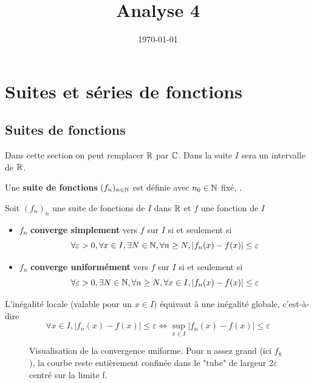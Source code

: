 \documentclass[a4paper,12pt]{article}
\title{ Analyse 4 }
\date{\today}
\begin{document}
\maketitle
\tableofcontents
\clearpage

\section{Suites et séries de fonctions}

\subsection{Suites de fonctions}

Dans cette section on peut remplacer $\mathbb{R}$ par $\mathbb{C}$.
Dans la suite $I$ sera un intervalle de $\mathbb{R}$.

\begin{definition}
    Une \textbf{suite de fonctions} $(f_n)_{n \in \mathbb{N}}$ est définie
    avec $n_0 \in \mathbb{N}$ fixé, .
\end{definition}

\begin{definition}
    Soit $(f_n)_n$ une suite de fonctions de $I$ dans $\mathbb{R}$ et $f$ une fonction de $I$ 

    \begin{itemize}[label=--]
        \item $f_n$ \textbf{converge simplement} vers $f$ sur $I$ si et seulement si
        $$
        \forall \varepsilon > 0, \forall x \in I, \exists N \in \mathbb{N}, \forall n \geq N, |f_n(x) - f(x)| \leq \varepsilon
        $$
        \item $f_n$ \textbf{converge uniformément} vers $f$ sur $I$ si et seulement si
        $$
        \forall \varepsilon > 0, \exists N \in \mathbb{N}, \forall n \geq N, \forall x \in I, |f_n(x) - f(x)| \leq \varepsilon
        $$
    \end{itemize}
\end{definition}

\begin{remarque}
    L'inégalité locale (valable pour un $x \in I$) équivaut à une inégalité globale, c'est-à-dire
    $$
    \forall x \in I, |f_n(x) - f(x)| \leq \varepsilon \iff \sup_{x \in I}|f_n(x) - f(x)| \leq \varepsilon
    $$
\end{remarque}

\tikzexternalenable
\begin{figure}[H]
    \centering
    
    \caption{Visualisation de la convergence uniforme. Pour n assez grand (ici $f_8$), la courbe reste entièrement confinée dans le "tube" de largeur 2$\varepsilon$ centré sur la limite f.}
\end{figure}
\tikzexternaldisable
\end{document}

